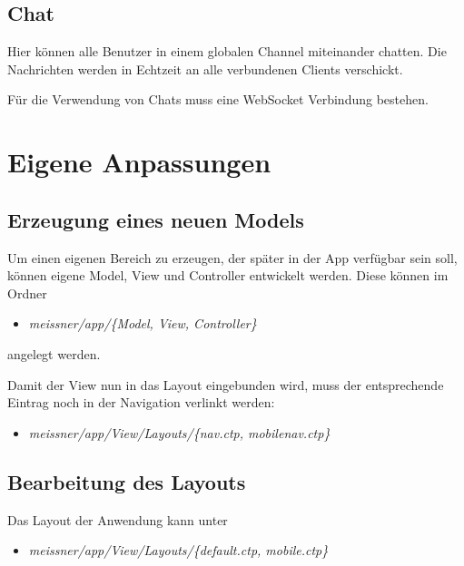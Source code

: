 
\section{Chat}
Hier können alle Benutzer in einem globalen Channel miteinander chatten. Die Nachrichten werden in Echtzeit an alle verbundenen Clients verschickt.\par

Für die Verwendung von Chats muss eine WebSocket Verbindung bestehen.


\chapter{Eigene Anpassungen}
\section{Erzeugung eines neuen Models}
Um einen eigenen Bereich zu erzeugen, der später in der App verfügbar sein soll, können eigene Model, View und Controller entwickelt werden. Diese können im Ordner

\begin{itemize}
	\item[] \emph{meissner/app/\{Model, View, Controller\}}
\end{itemize}

angelegt werden.\par

Damit der View nun in das Layout eingebunden wird, muss der entsprechende Eintrag noch in der Navigation verlinkt werden:

\begin{itemize}
	\item[] \emph{meissner/app/View/Layouts/\{nav.ctp, mobilenav.ctp\}}
\end{itemize}

\section{Bearbeitung des Layouts}
Das Layout der Anwendung kann unter 

\begin{itemize}
	\item[] \emph{meissner/app/View/Layouts/\{default.ctp, mobile.ctp\}}
\end{itemize}


